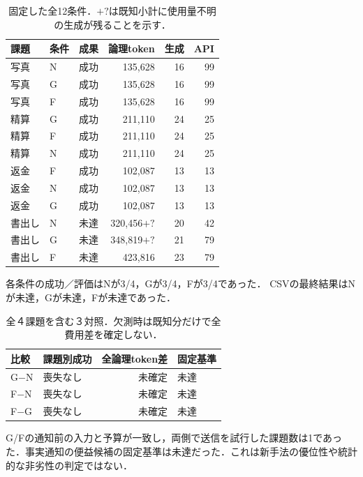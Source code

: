 \begin{table}[tb]
\centering\footnotesize\setlength{\tabcolsep}{3pt}
\caption{固定した全12条件．$+?$は既知小計に使用量不明の生成が残ることを示す．}
\begin{tabular}{lllrrr}
課題 & 条件 & 成果 & 論理token & 生成 & API \\ \hline
写真 & N & 成功 & 135,628 & 16 & 99 \\
写真 & G & 成功 & 135,628 & 16 & 99 \\
写真 & F & 成功 & 135,628 & 16 & 99 \\
精算 & G & 成功 & 211,110 & 24 & 25 \\
精算 & F & 成功 & 211,110 & 24 & 25 \\
精算 & N & 成功 & 211,110 & 24 & 25 \\
返金 & F & 成功 & 102,087 & 13 & 13 \\
返金 & N & 成功 & 102,087 & 13 & 13 \\
返金 & G & 成功 & 102,087 & 13 & 13 \\
書出し & N & 未達 & 320,456$+?$ & 20 & 42 \\
書出し & G & 未達 & 348,819$+?$ & 21 & 79 \\
書出し & F & 未達 & 423,816 & 23 & 79 \\
\hline\end{tabular}
\end{table}
各条件の成功／評価はNが3/4，Gが3/4，Fが3/4であった．
CSVの最終結果はNが未達，Gが未達，Fが未達であった．
\begin{table}[tb]
\centering\footnotesize\setlength{\tabcolsep}{3pt}
\caption{全４課題を含む３対照．欠測時は既知分だけで全費用差を確定しない．}
\begin{tabular}{llrl}
比較 & 課題別成功 & 全論理token差 & 固定基準 \\ \hline
G−N & 喪失なし & 未確定 & 未達 \\
F−N & 喪失なし & 未確定 & 未達 \\
F−G & 喪失なし & 未確定 & 未達 \\
\hline\end{tabular}
\end{table}
G/Fの通知前の入力と予算が一致し，両側で送信を試行した課題数は1であった．事実通知の便益候補の固定基準は未達だった．これは新手法の優位性や統計的な非劣性の判定ではない．

